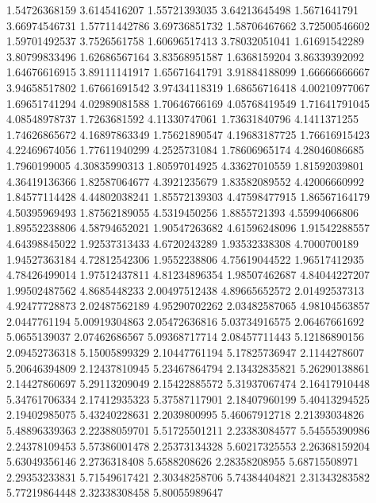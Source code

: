   1.54726368159     3.6145416207
  1.55721393035    3.64213645498
   1.5671641791    3.66974546731
  1.57711442786    3.69736851732
  1.58706467662    3.72500546602
  1.59701492537     3.7526561758
  1.60696517413    3.78032051041
  1.61691542289    3.80799833496
  1.62686567164    3.83568951587
   1.6368159204    3.86339392092
  1.64676616915    3.89111141917
  1.65671641791    3.91884188099
  1.66666666667    3.94658517802
  1.67661691542    3.97434118319
  1.68656716418    4.00210977067
  1.69651741294    4.02989081588
  1.70646766169    4.05768419549
  1.71641791045    4.08548978737
   1.7263681592    4.11330747061
  1.73631840796     4.1411371255
  1.74626865672    4.16897863349
  1.75621890547    4.19683187725
  1.76616915423    4.22469674056
  1.77611940299     4.2525731084
  1.78606965174    4.28046086685
   1.7960199005    4.30835990313
  1.80597014925    4.33627010559
  1.81592039801    4.36419136366
  1.82587064677     4.3921235679
  1.83582089552    4.42006660992
  1.84577114428    4.44802038241
  1.85572139303    4.47598477915
  1.86567164179    4.50395969493
  1.87562189055     4.5319450256
   1.8855721393    4.55994066806
  1.89552238806    4.58794652021
  1.90547263682    4.61596248096
  1.91542288557    4.64398845022
  1.92537313433     4.6720243289
  1.93532338308     4.7000700189
  1.94527363184    4.72812542306
   1.9552238806    4.75619044522
  1.96517412935    4.78426499014
  1.97512437811    4.81234896354
  1.98507462687    4.84044227207
  1.99502487562     4.8685448233
  2.00497512438    4.89665652572
  2.01492537313    4.92477728873
  2.02487562189    4.95290702262
  2.03482587065    4.98104563857
   2.0447761194    5.00919304863
  2.05472636816    5.03734916575
  2.06467661692     5.0655139037
  2.07462686567    5.09368717714
  2.08457711443    5.12186890156
  2.09452736318    5.15005899329
  2.10447761194    5.17825736947
   2.1144278607    5.20646394809
  2.12437810945    5.23467864794
  2.13432835821    5.26290138861
  2.14427860697    5.29113209049
  2.15422885572    5.31937067474
  2.16417910448    5.34761706334
  2.17412935323    5.37587117901
  2.18407960199    5.40413294525
  2.19402985075    5.43240228631
   2.2039800995    5.46067912718
  2.21393034826    5.48896339363
  2.22388059701    5.51725501211
  2.23383084577    5.54555390986
  2.24378109453    5.57386001478
  2.25373134328    5.60217325553
  2.26368159204    5.63049356146
   2.2736318408     5.6588208626
  2.28358208955    5.68715508971
  2.29353233831    5.71549617421
  2.30348258706    5.74384404821
  2.31343283582    5.77219864448
  2.32338308458    5.80055989647
